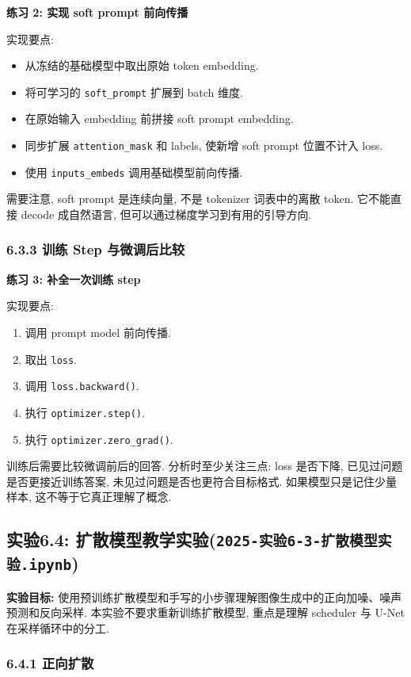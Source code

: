 \documentclass{../../nndlcourse}
\begin{document}
\textbf{练习 2: 实现 soft prompt 前向传播}

实现要点:
\begin{itemize}
    \item 从冻结的基础模型中取出原始 token embedding.
    \item 将可学习的 \texttt{soft\_prompt} 扩展到 batch 维度.
    \item 在原始输入 embedding 前拼接 soft prompt embedding.
    \item 同步扩展 \texttt{attention\_mask} 和 labels, 使新增 soft prompt 位置不计入 loss.
    \item 使用 \texttt{inputs\_embeds} 调用基础模型前向传播.
\end{itemize}
需要注意, soft prompt 是连续向量, 不是 tokenizer 词表中的离散 token. 它不能直接 decode 成自然语言, 但可以通过梯度学习到有用的引导方向.

\subsubsection*{6.3.3 训练 Step 与微调后比较}

\textbf{练习 3: 补全一次训练 step}

实现要点:
\begin{enumerate}
    \item 调用 prompt model 前向传播.
    \item 取出 \texttt{loss}.
    \item 调用 \texttt{loss.backward()}.
    \item 执行 \texttt{optimizer.step()}.
    \item 执行 \texttt{optimizer.zero\_grad()}.
\end{enumerate}
训练后需要比较微调前后的回答. 分析时至少关注三点: loss 是否下降, 已见过问题是否更接近训练答案, 未见过问题是否也更符合目标格式. 如果模型只是记住少量样本, 这不等于它真正理解了概念.

\subsection*{实验6.4: 扩散模型教学实验(\texttt{2025-实验6-3-扩散模型实验.ipynb})}

\textbf{实验目标: }使用预训练扩散模型和手写的小步骤理解图像生成中的正向加噪、噪声预测和反向采样. 本实验不要求重新训练扩散模型, 重点是理解 scheduler 与 U-Net 在采样循环中的分工.

\subsubsection*{6.4.1 正向扩散}
\end{document}
